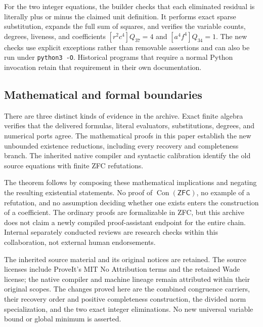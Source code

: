 \documentclass[11pt,a4paper]{article}
\theoremstyle{definition}
\theoremstyle{remark}
\newcommand{\Con}{\operatorname{Con}}
\newcommand{\ZFC}{\mathsf{ZFC}}
\newcommand{\sourcepath}[1]{\texttt{\small #1}}
\begin{document}
For the two integer equations, the builder checks that each eliminated
residual is literally plus or minus the claimed unit definition.
It performs exact sparse substitution, expands the full sum of squares,
and verifies the variable counts, degrees, liveness, and coefficients
\([r^2c^4]Q_{37}=4\) and \([a^4f^4]Q_{34}=1\).
The new checks use explicit exceptions rather than removable
assertions and can also be run under \sourcepath{python3 -O}.
Historical programs that require a normal Python invocation retain
that requirement in their own documentation.

\subsection{Mathematical and formal boundaries}

There are three distinct kinds of evidence in the archive. Exact finite
algebra verifies that the delivered formulas, literal evaluators,
substitutions, degrees, and numerical ports agree. The mathematical
proofs in this paper establish the new unbounded existence reductions,
including every recovery and completeness branch. The inherited native
compiler and syntactic calibration identify the old source equations
with finite ZFC refutations.

The theorem follows by composing these mathematical implications and
negating the resulting existential statements. No proof of
\(\Con(\ZFC)\), no example of a refutation, and no assumption deciding
whether one exists enters the construction of a coefficient.
The ordinary proofs are formalizable in ZFC, but this archive does not
claim a newly compiled proof-assistant endpoint for the entire chain.
Internal separately conducted reviews are research checks within this
collaboration, not external human endorsements.

The inherited source material and its original notices are retained.
The source licenses include ProveIt's MIT No Attribution terms and the
retained Wade license; the native compiler and machine lineage remain
attributed within their original scopes. The changes proved here are
the combined congruence carriers, their recovery order and positive
completeness construction, the divided norm specialization, and the two
exact integer eliminations. No new universal variable bound or global
minimum is asserted.
\end{document}
